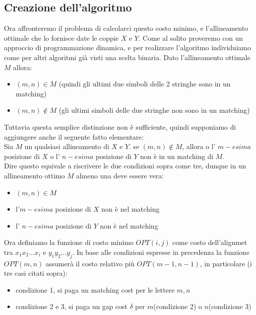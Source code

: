 \subsection{Creazione dell'algoritmo}

Ora affronteremo il problema di calcolarci questo costo minimo, e l'allineamento
ottimale che lo fornisce date le coppie $X$ e $Y$. Come al solito proveremo con
un approccio di programmazione dinamica, e per realizzare l'algoritmo
individuiamo come per altri algoritmi già visti una scelta binaria. Dato
l'allineamento ottimale $M$ allora:

\begin{itemize}
    \item $(m,n) \in M$ (quindi gli ultimi due
          simboli delle 2 stringhe sono in un matching)
    \item $(m,n) \notin M$ (gli ultimi
          simboli delle due stringhe non sono in un matching)
\end{itemize}

Tuttavia questa semplice distinzione non è sufficiente, quindi supponiamo di
aggiungere anche il seguente fatto elementare:\\

\- Sia $M$ un qualsiasi allineamento di $X$ e $Y$. se $(m,n) \notin M$, allora o
l' $m-esima$ posizione di $X$ o l' $n-esima$ posizione di $Y$ non è in un
matching di $M$.\\

Dire questo equivale a riscrivere le due condizioni sopra come tre, dunque in un
allineamento ottimo $M$ almeno una deve essere vera:

\begin{itemize}
    \item $(m,n) \in M$
    \item l'$m-esima$ posizione di $X$ non è nel matching
    \item l' $n-esima$ posizione di $Y$ non è nel matching
\end{itemize}

Ora definiamo la funzione di costo minimo $OPT(i,j)$ come costo dell'alignmet
tra $x_1 x_2 \ldots x_i$ e $y_1 y_2 \ldots y_j$. In base alle condizioni
espresse in precedenza la funzione $OPT(m,n)$ assumerà il costo relativo più
$OPT(m-1,n-1)$, in particolare (i tre casi citati sopra):

\begin{itemize}
    \item condizione 1, si
          paga un matching cost per le lettere $m,n$
    \item condizione 2 e 3, si paga un gap
          cost $\delta$ per $m$(condizione 2) o $n$(condizione 3)
\end{itemize}

